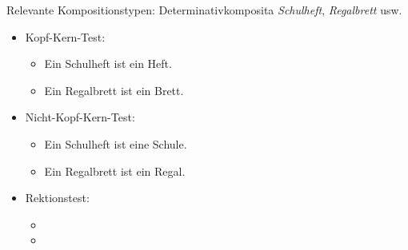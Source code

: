 \begin{frame}
  {Relevante Kompositionstypen: Determinativkomposita}
  \pause
  \textit{Schulheft}, \textit{Regalbrett} usw.
  \pause
  \Halbzeile
  \begin{itemize}[<+->]
    \item Kopf-Kern-Test:
      \begin{itemize}[<+->]
        \item Ein Schulheft ist ein Heft. \Ck
        \item Ein Regalbrett ist ein Brett. \Ck
      \end{itemize}
    \item Nicht-Kopf-Kern-Test:
      \begin{itemize}[<+->]
        \item Ein Schulheft ist eine Schule. \Fl
        \item Ein Regalbrett ist ein Regal. \Fl
      \end{itemize}
      \Halbzeile
    \item Rektionstest:
      \begin{itemize}[<+->]
        \item {}
        \item {}
      \end{itemize}
  \end{itemize}
\end{frame}


